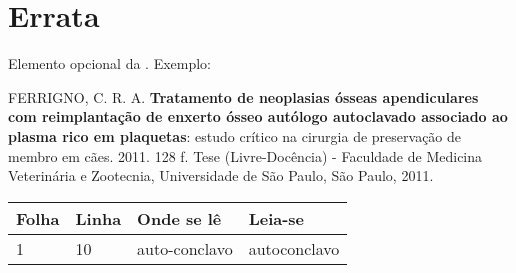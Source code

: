 \documentclass[../monografia.tex]{subfiles}
\begin{document}
    \clearpage
    {\centering   
        \chapter*{Errata}
    }
    Elemento opcional da . Exemplo:
    
    \vspace{\onelineskip}
    
    FERRIGNO, C. R. A. \textbf{Tratamento de neoplasias ósseas apendiculares com
    reimplantação de enxerto ósseo autólogo autoclavado associado ao plasma
    rico em plaquetas}: estudo crítico na cirurgia de preservação de membro em
    cães. 2011. 128 f. Tese (Livre-Docência) - Faculdade de Medicina Veterinária e
    Zootecnia, Universidade de São Paulo, São Paulo, 2011.
    
    \begin{table}[htb]
        \center
        \footnotesize
        \begin{tabular}{|p{1.4cm}|p{1cm}|p{3cm}|p{3cm}|}
          \hline
           \textbf{Folha} & \textbf{Linha}  & \textbf{Onde se lê}  & \textbf{Leia-se}  \\
            \hline
            1 & 10 & auto-conclavo & autoconclavo\\
           \hline
        \end{tabular}
    \end{table}
        
\end{document}
